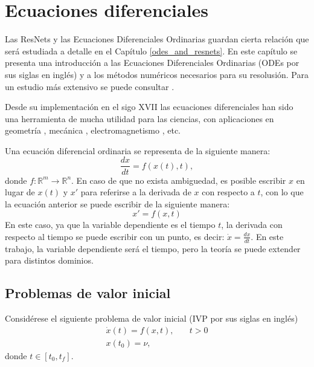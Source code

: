 

\chapter{Ecuaciones diferenciales}
\label{odes_chapter}
Las ResNets y las Ecuaciones Diferenciales Ordinarias guardan cierta relación que será estudiada a detalle en el Capítulo \ref{odes_and_resnets}. En este capítulo se presenta una introducción a las Ecuaciones Diferenciales Ordinarias (ODEs por sus siglas en inglés) y a los métodos numéricos necesarios para su resolusión. Para un estudio más extensivo se puede consultar \cite{sauer, Ascher}.

Desde su implementación en el sigo XVII \cite{ode_history} las ecuaciones diferenciales han sido una herramienta de mucha utilidad para las ciencias, con aplicaciones en geometría \cite{geometry_and_odes}, mecánica \cite{classical_mechanics}, electromagnetismo \cite{electromagnetism_and_odes}, etc.

Una ecuación diferencial ordinaria se representa de la siguiente manera:
\begin{equation}
    \frac{dx}{dt} = f(x(t), t),
\end{equation}
donde $f: \mathbb R^m \to \mathbb R^n$.
En caso de que no exista ambiguedad, es posible escribir $x$ en lugar de $x(t)$ y $x'$ para referirse a la derivada de $x$ con respecto a $t$, con lo que la ecuación anterior se puede escribir de la siguiente manera:
\begin{equation}
    x' = f(x,t)
\end{equation}
En este caso, ya que la variable dependiente es el tiempo $t$, la derivada con respecto al tiempo se puede escribir con un punto, es decir: $\dot x = \frac{dx}{dt}$. En este trabajo, la variable dependiente será el tiempo, pero la teoría se puede extender para distintos dominios.
\section{Problemas de valor inicial}
Considérese el siguiente problema de valor inicial (IVP por sus siglas en inglés)
\begin{align}
    \label{ode} \dot x(t) = f(x, t),& \quad t>0\\
    \label{initial_value} x(t_0) = \nu,&
\end{align}
donde $t\in [t_0, t_f]$. 


